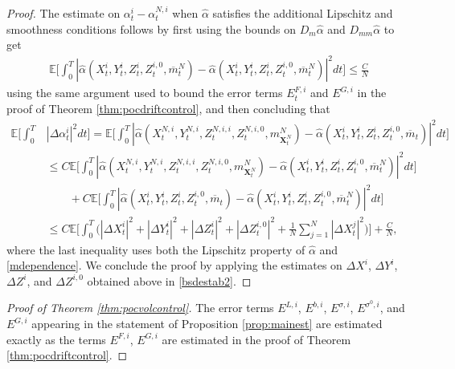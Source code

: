 \documentclass[11pt,reqno]{amsart}
\numberwithin{equation}{section}
\theoremstyle{definition}
\def\E{{\mathbb E}}
\newcommand{\bX}{\mathbf{X}}
\newcommand{\ov}{\overline}
\def \E{\mathbb{E}}
\begin{document}
\begin{proof}
The estimate on $\alpha_t^i - \alpha_t^{N,i}$ when $\widehat{\alpha}$ satisfies the additional Lipschitz and smoothness conditions follows by first using the bounds on $D_m \widehat{\alpha}$ and $D_{mm} \widehat{\alpha}$ to get
\begin{align} \label{mdependence}
\E\bigg[\int_0^T |\widehat{\alpha}(X_t^i, Y_t^i,Z_t^i, Z_t^{i,0}, \ov{m}_t^N) - \widehat{\alpha}(X_t^i, Y_t^i,Z_t^i, Z_t^{i,0}, \ov{m}_t^N)|^2 dt\bigg] \leq \frac{C}{N}
\end{align}
using the same argument used to bound the error terms $E_t^{F,i}$ and $E^{G,i}$ in the proof of Theorem \ref{thm:pocdriftcontrol}, and then concluding that 
\begin{align*}
\E\bigg[\int_0^T &|\Delta \alpha_t^i|^2 dt \bigg] = \E\bigg[\int_0^T |\widehat{\alpha}(X_t^{N,i}, Y_t^{N,i}, Z_t^{N,i,i}, Z_t^{N,i,0}, m_{\bX_t^N}^N) - \widehat{\alpha}(X_t^{i}, Y_t^{i}, Z_t^{i}, Z_t^{i,0}, \ov{m}_t)  |^2 dt \bigg] \\
&\leq C\E\bigg[\int_0^T |\widehat{\alpha}(X_t^{N,i}, Y_t^{N,i}, Z_t^{N,i,i}, Z_t^{N,i,0}, m_{\bX_t^N}^N) - \widehat{\alpha}(X_t^{i}, Y_t^{i}, Z_t^{i}, Z_t^{i,0}, \ov{m}_t^N)  |^2 dt \bigg] \\
&\qquad + C\E\bigg[\int_0^T |\widehat{\alpha}(X_t^i, Y_t^i,Z_t^i, Z_t^{i,0}, \ov{m}_t) - \widehat{\alpha}(X_t^i, Y_t^i,Z_t^i, Z_t^{i,0}, \ov{m}_t^N)|^2 dt \bigg] \\
&\leq C \E\bigg[\int_0^T \Big(|\Delta X_t^i|^2 + |\Delta Y_t^i|^2 + |\Delta Z_t^i|^2 + |\Delta Z_t^{i,0}|^2 + \frac{1}{N} \sum_{j = 1}^N |\Delta X_t^j|^2 \Big) \bigg] + \frac{C}{N}, 
\end{align*}
where the last inequality uses both the Lipschitz property of $\widehat{\alpha}$ and \eqref{mdependence}. We conclude the proof by applying the estimates on $\Delta X^i$, $\Delta Y^i$, $\Delta Z^i$, and $\Delta Z^{i,0}$ obtained above in \eqref{bsdestab2}.
\end{proof}

\begin{proof}[Proof of Theorem \ref{thm:pocvolcontrol}]
The error terms $E^{L,i}$, $E^{b,i}$, $E^{\sigma,i}$, $E^{\sigma^0,i}$, and $E^{G,i}$ appearing in the statement of Proposition \ref{prop:mainest} are estimated exactly as the terms $E^{F,i}$, $E^{G,i}$ are estimated in the proof of Theorem \ref{thm:pocdriftcontrol}.
\end{proof}
\end{document}
